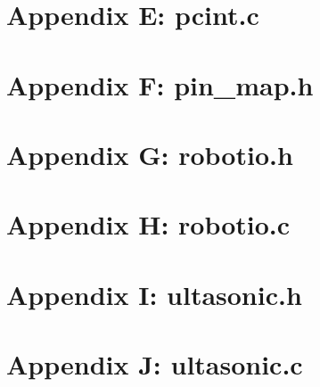\documentclass[letterpaper,11pt]{texMemo} %
\begin{document}
\section*{Appendix E: pcint.c}
\begin{tiny}

\end{tiny}
\newpage

\section*{Appendix F: pin_map.h}
\begin{tiny}

\end{tiny}
\newpage

\section*{Appendix G: robotio.h}
\begin{tiny}

\end{tiny}
\newpage

\section*{Appendix H: robotio.c}
\begin{tiny}

\end{tiny}
\newpage

\section*{Appendix I: ultasonic.h}
\begin{tiny}

\end{tiny}
\newpage

\section*{Appendix J: ultasonic.c}
\begin{tiny}

\end{tiny}
\newpage
\end{document}
